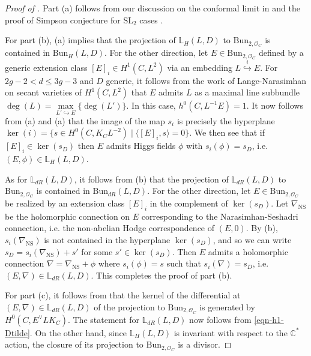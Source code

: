 \documentclass[twoside, 11pt]{article}
\numberwithin{equation}{section}
\theoremstyle{theorem}
\numberwithin{theorem}{section}
\theoremstyle{definition}
\begin{document}
\begin{proof}[Proof of ]
Part (a) follows from our discussion on the conformal limit in  \cite{CW18} and the proof of Simpson conjecture for $\mathrm{SL}_2$ cases \cite{DS24}. 

For part (b), (a) implies that the projection of $\mathbb{L}_H(L, D)$ to $\mathrm{Bun}_{2, \mathcal{O}_C}$ is contained in $\mathrm{Bun}_{H}(L, D)$.
For the other direction, let $E \in \mathrm{Bun}_{2, \mathcal{O}_C}$ defined by a generic extension class $[E]_i \in H^1(C, L^2)$ via an embedding $L \overset{i}{\hookrightarrow} E$. 
For $2g-2 < d \leq 3g-3$ and $D$ generic, it follows from the work of Lange-Narasimhan \cite{LN83} on secant varieties of $H^1(C, L^2)$ that $E$ admits $L$ as a maximal line subbundle $\deg(L) = \underset{L' \hookrightarrow E}{\max} \{\deg(L') \}$. 
In this case, $h^0(C, L^{-1}E) = 1$. It now follows from (a) and (a) that the image of the map $s_i$ is precisely the hyperplane $\ker(i) = \{ s\in H^0(C, K_C L^{-2}) \mid \langle [E]_i, s \rangle = 0 \}$. 
We then see that if $[E]_i \in \ker(s_D)$ then $E$ admits Higgs fields $\phi$ with $s_i(\phi) = s_D$, i.e. $(E, \phi) \in \mathbb{L}_H(L, D)$.

As for $\mathbb{L}_{dR}(L, D)$, it follows from (b) that the projection of $\mathbb{L}_{dR}(L, D)$ to $\mathrm{Bun}_{2, \mathcal{O}_C}$ is contained in $\mathrm{Bun}_{dR}(L, D)$. For the other direction, let $E \in \mathrm{Bun}_{2, \mathcal{O}_C}$ be realized by an extension class $[E]_i$ in the complement of $\ker(s_D)$. 
Let $\nabla_{\mathrm{NS}}$ be the holomorphic connection on $E$ corresponding to the Narasimhan-Seshadri connection, i.e. the non-abelian Hodge correspondence of $(E, 0)$. 
By (b), $s_i(\nabla_{\mathrm{NS}})$ is not contained in the hyperplane $\ker(s_D)$, and so we can write $s_D = s_i(\nabla_{\mathrm{NS}}) + s'$ for some $s' \in \ker(s_D)$. 
Then $E$ admits a holomorphic connection $\nabla = \nabla_{\mathrm{NS}} + \phi$ where $s_i(\phi) = s$ such that $s_i(\nabla) = s_D$, i.e. $(E, \nabla) \in \mathbb{L}_{dR}(L, D)$.
This completes the proof of part (b).

For part (c), it follows from  that the kernel of the differential at $(E, \nabla) \in \mathbb{L}_{dR}(L, D)$ of the projection to $\mathrm{Bun}_{2, \mathcal{O}_C}$ is generated by $H^0(C, E^\vee L K_C)$. 
The statement for $\mathbb{L}_{dR}(L, D)$ now follows from \eqref{eqn-h1-Dtilde}.
On the other hand, since $\mathbb{L}_{H}(L, D)$ is invariant with respect to the $\mathbb{C}^\ast$ action, the closure of its projection to $\mathrm{Bun}_{2, \mathcal{O}_C}$ is a divisor.
\end{proof}
\end{document}
